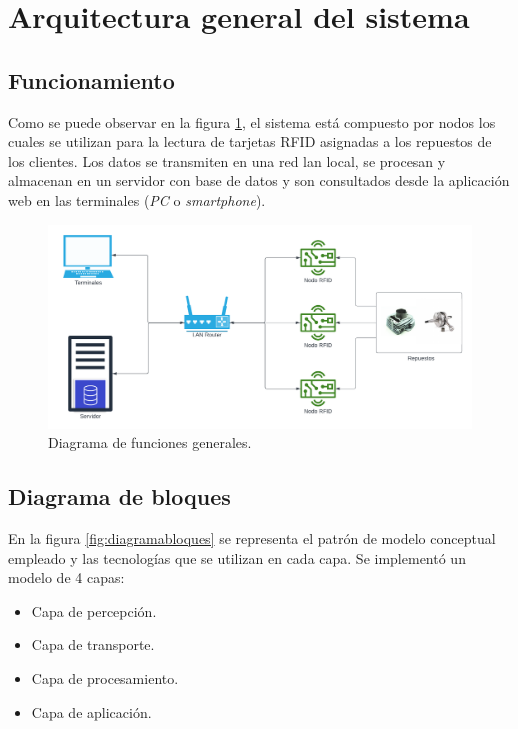 \section{Arquitectura general del sistema}
\label{sec:arquitecturagral}

\subsection{Funcionamiento}
\label{subsec:funcionamiento}
Como se puede observar en la figura \ref{fig:diagramafunciones}, el sistema está compuesto por nodos los cuales se utilizan para la lectura de tarjetas RFID asignadas a los repuestos de los clientes. Los datos se transmiten en una red lan local, se procesan y almacenan en un servidor con base de datos y son consultados desde la aplicación web en las terminales (\textit{PC} o \textit{smartphone}).

\begin{figure}[ht]
	\centering
	\includegraphics[scale=.20]{./Figures/diagramafunciones.png}
	\caption{Diagrama de funciones generales.}
	\label{fig:diagramafunciones}
\end{figure}

\subsection{Diagrama de bloques}
\label{subsec:diagramabloques}
En la figura \ref{fig:diagramabloques} se representa el patrón de modelo conceptual empleado y las tecnologías que se utilizan en cada capa. Se implementó un modelo de 4 capas: 

\begin{itemize}
\item Capa de percepción.
\item Capa de transporte.
\item Capa de procesamiento.
\item Capa de aplicación.
\end{itemize}


